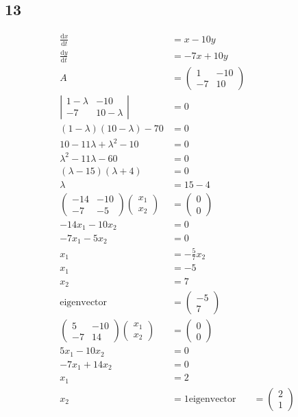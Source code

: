 \documentclass{article}
\begin{document}
\subsection*{13}
\begin{align*}
  \frac{\mathrm{d}x}{\mathrm{d}t}&=x-10y\\
  \frac{\mathrm{d}y}{\mathrm{d}t}&=-7x+10y\\
  A&=\left(\begin{array}{cc}1&-10\\-7&10\end{array}\right)\\
  \left\lvert\begin{array}{cc}1-\lambda&-10\\-7&10-\lambda\end{array}\right\rvert&=0\\
  (1-\lambda)(10-\lambda)-70&=0\\
  10-11\lambda+\lambda^2-10&=0\\
  \lambda^2-11\lambda-60&=0\\
  (\lambda-15)(\lambda+4)&=0\\
  \lambda&=15-4\\
  \left(\begin{array}{cc}-14&-10\\-7&-5\end{array}\right)\left(\begin{array}{c}x_1\\x_2\end{array}\right)&=\left(\begin{array}{c}0\\0\end{array}\right)\\
  -14x_1-10x_2&=0\\
  -7x_1-5x_2&=0\\
  x_1&=-\frac{5}{7}x_2\\
  x_1&=-5\\
  x_2&=7\\
  \text{eigenvector}&=\left(\begin{array}{c}-5\\7\end{array}\right)\\
  \left(\begin{array}{cc}5&-10\\-7&14\end{array}\right)\left(\begin{array}{c}x_1\\x_2\end{array}\right)&=\left(\begin{array}{c}0\\0\end{array}\right)\\
  5x_1-10x_2&=0\\
  -7x_1+14x_2&=0\\
  x_1&=2\\
  x_2&=1
  \text{eigenvector}&=\left(\begin{array}{c}2\\1\end{array}\right)
\end{align*}
\end{document}
